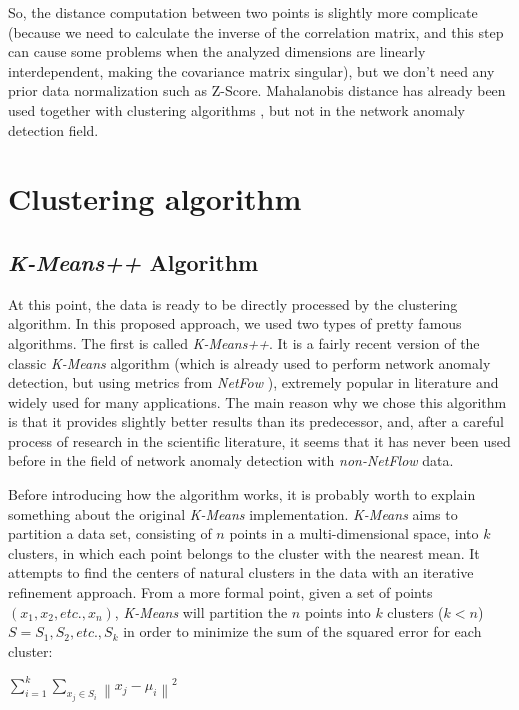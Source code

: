 \documentclass[12pt,a4paper,cucitura]{toptesi}
\begin{document}
So, the distance computation between two points is slightly more complicate (because we need to calculate the inverse of the correlation matrix, and this step can cause some problems when the analyzed dimensions are linearly interdependent, making the covariance matrix singular), but we don't need any prior data normalization such as Z-Score.
Mahalanobis distance has already been used together with clustering algorithms \cite{mahal}, but not in the network anomaly detection field.



\section{Clustering algorithm}

\subsection{\emph{K-Means++} Algorithm}
At this point, the data is ready to be directly processed by the clustering algorithm.
In this proposed approach, we used two types of pretty famous algorithms. The first is called \emph{K-Means++}. It is a fairly recent version of the classic \emph{K-Means} algorithm (which is already used to perform network anomaly detection, but using metrics from \emph{NetFow} \cite{kmeans}), extremely popular in literature and widely used for many applications.
The main reason why we chose this algorithm is that it provides slightly better results than its predecessor, and, after a careful process of research in the scientific literature, it seems that it has never been used before in the field of network anomaly detection with \emph{non-NetFlow} data. 

Before introducing how the algorithm works, it is probably worth to explain something about the original \emph{K-Means} implementation.
\emph{K-Means} aims to partition a data set, consisting of $n$ points in a multi-dimensional space, into $k$ clusters, in which each point belongs to the cluster with the nearest mean. It attempts to find the centers of natural clusters in the data with an iterative refinement approach.
From a more formal point, given a set of points $(x_1, x_2, etc., x_n)$, \emph{K-Means} will partition the $n$ points into $k$ clusters ($k < n$) $S = {S_1, S_2, etc., S_k}$ in order to minimize the sum of the squared error for each cluster:

\begin{center}
\Large
$\sum_{i=1}^{k}{\sum_{x_j \in S_i}{\left \| x_j - \mu_i  \right\|^2}}$
\end{center}
\end{document}

